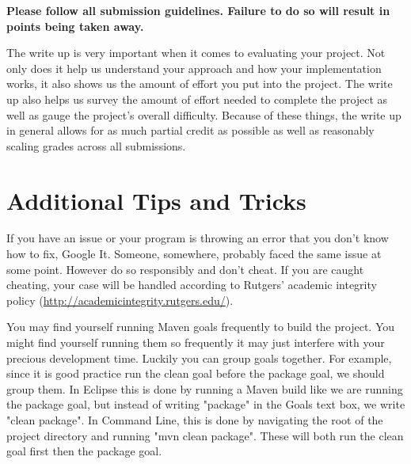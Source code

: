 \documentclass{article}
\begin{document}
\noindent \textbf{Please follow all submission guidelines. Failure to do so will result in points being taken away.}

\begin{info}
The write up is very important when it comes to evaluating your project. Not only does it help us understand your approach and how your implementation works, it also shows us the amount of effort you put into the project. The write up also helps us survey the amount of effort needed to complete the project as well as gauge the project's overall difficulty. Because of these things, the write up in general allows for as much partial credit as possible as well as reasonably scaling grades across all submissions.
\end{info}



\section{Additional Tips and Tricks} %
\begin{info}
If you have an issue or your program is throwing an error that you don't know how to fix, Google It. Someone, somewhere, probably faced the same issue at some point. However do so responsibly and don't cheat. If you are caught cheating, your case will be handled according to Rutgers' academic integrity policy (\href{http://academicintegrity.rutgers.edu/}{http://academicintegrity.rutgers.edu/}).
\end{info}
\begin{info}
You may find yourself running Maven goals frequently to build the project. You might find yourself running them so frequently it may just interfere with your precious development time. Luckily you can group goals together. For example, since it is good practice run the clean goal before the package goal, we should group them. In Eclipse this is done by running a Maven build like we are running the package goal, but instead of writing "package" in the Goals text box, we write "clean package". In Command Line, this is done by navigating the root of the project directory and running "mvn clean package". These will both run the clean goal first then the package goal. 
\end{info}
\end{document}
